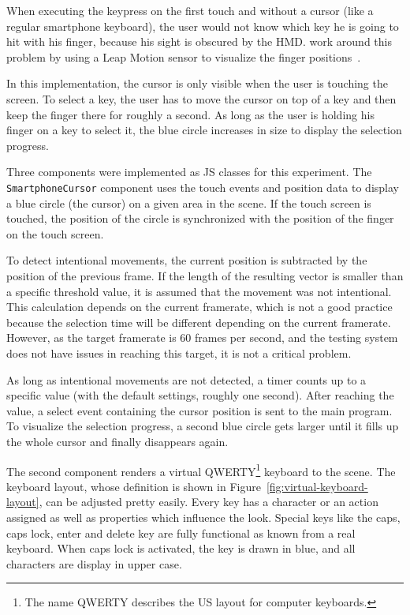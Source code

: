 When executing the keypress on the first touch and without a cursor (like a regular smartphone keyboard), the user would not know which key he is going to hit with his finger, because his sight is obscured by the \ac{HMD}. \citeauthor{Dias.2018} work around this problem by using a Leap Motion sensor to visualize the finger positions~\cite[4]{Dias.2018}.

In this implementation, the cursor is only visible when the user is touching the screen. To select a key, the user has to move the cursor on top of a key and then keep the finger there for roughly a second. As long as the user is holding his finger on a key to select it, the blue circle increases in size to display the selection progress. 

Three components were implemented as \acl{JS} classes for this experiment. The \lstinline{SmartphoneCursor} component uses the touch events and position data to display a blue circle (the cursor) on a given area in the scene. If the touch screen is touched, the position of the circle is synchronized with the position of the finger on the touch screen. 

To detect intentional movements, the current position is subtracted by the position of the previous frame. If the length of the resulting vector is smaller than a specific threshold value, it is assumed that the movement was not intentional. This calculation depends on the current framerate, which is not a good practice because the selection time will be different depending on the current framerate. However, as the target framerate is 60 frames per second, and the testing system does not have issues in reaching this target, it is not a critical problem.

As long as intentional movements are not detected, a timer counts up to a specific value (with the default settings, roughly one second). After reaching the value, a select event containing the cursor position is sent to the main program. To visualize the selection progress, a second blue circle gets larger until it fills up the whole cursor and finally disappears again. 

The second component renders a virtual QWERTY\footnote{The name QWERTY describes the US layout for computer keyboards.} keyboard to the scene. The keyboard layout, whose definition is shown in Figure~\ref{fig:virtual-keyboard-layout}, can be adjusted pretty easily. Every key has a character or an action assigned as well as properties which influence the look. Special keys like the caps, caps lock, enter and delete key are fully functional as known from a real keyboard. When caps lock is activated, the key is drawn in blue, and all characters are display in upper case. 

